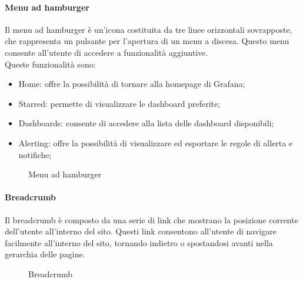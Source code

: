\paragraph{Menu ad hamburger}
Il menu ad hamburger è un'icona costituita da tre linee orizzontali sovrapposte, che rappresenta un pulsante per l'apertura di un menu a discesa. Questo menu consente all'utente di accedere a funzionalità aggiuntive.\\
Queste funzionalità sono:
\begin{itemize}
    \item Home: offre la possibilità di tornare alla homepage di Grafana;
    \item Starred: permette di visualizzare le dashboard preferite;
    \item Dashboards: consente di accedere alla lista delle dashboard disponibili;
    \item Alerting: offre la possibilità di visualizzare ed esportare le regole di allerta e notifiche;
\end{itemize}
\begin{figure}[H]
    \centering
    \caption{Menu ad hamburger}
    \label{fig:my_label}
\end{figure}

\paragraph{Breadcrumb}
Il breadcrumb è composto da una serie di link che mostrano la posizione corrente dell'utente all'interno del sito. Questi link consentono all'utente di navigare facilmente all'interno del sito, tornando indietro o spostandosi avanti nella gerarchia delle pagine.\\
\begin{figure}[H]
    \centering
    \caption{Breadcrumb}
    \label{fig:my_label}
\end{figure}

